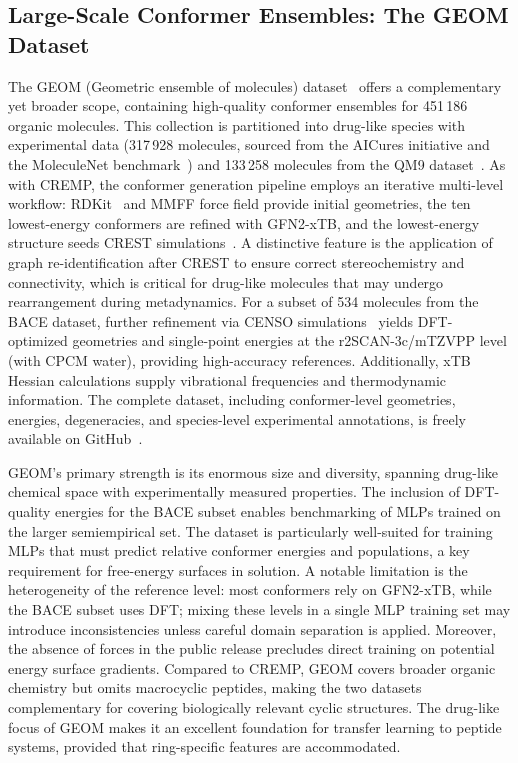 \documentclass[12pt]{article}
\begin{document}
\subsection{Large-Scale Conformer Ensembles: The GEOM Dataset}
\label{sec:geom}

The GEOM (Geometric ensemble of molecules) dataset~\cite{ds34-16} offers a complementary yet broader scope, containing high-quality conformer ensembles for 451\,186 organic molecules. This collection is partitioned into drug-like species with experimental data (317\,928 molecules, sourced from the AICures initiative and the MoleculeNet benchmark~\cite{ds34-166}) and 133\,258 molecules from the QM9 dataset~\cite{ds34-1}. As with CREMP, the conformer generation pipeline employs an iterative multi-level workflow: RDKit~\cite{ds33-97} and MMFF force field provide initial geometries, the ten lowest-energy conformers are refined with GFN2-xTB, and the lowest-energy structure seeds CREST simulations~\cite{ds34-164}. A distinctive feature is the application of graph re-identification after CREST to ensure correct stereochemistry and connectivity, which is critical for drug-like molecules that may undergo rearrangement during metadynamics. For a subset of 534 molecules from the BACE dataset, further refinement via CENSO simulations~\cite{ds34-167} yields DFT-optimized geometries and single-point energies at the r2SCAN-3c/mTZVPP level (with CPCM water), providing high-accuracy references. Additionally, xTB Hessian calculations supply vibrational frequencies and thermodynamic information. The complete dataset, including conformer-level geometries, energies, degeneracies, and species-level experimental annotations, is freely available on GitHub~\cite{ds34-168}.

GEOM's primary strength is its enormous size and diversity, spanning drug-like chemical space with experimentally measured properties. The inclusion of DFT-quality energies for the BACE subset enables benchmarking of MLPs trained on the larger semiempirical set. The dataset is particularly well-suited for training MLPs that must predict relative conformer energies and populations, a key requirement for free-energy surfaces in solution. A notable limitation is the heterogeneity of the reference level: most conformers rely on GFN2-xTB, while the BACE subset uses DFT; mixing these levels in a single MLP training set may introduce inconsistencies unless careful domain separation is applied. Moreover, the absence of forces in the public release precludes direct training on potential energy surface gradients. Compared to CREMP, GEOM covers broader organic chemistry but omits macrocyclic peptides, making the two datasets complementary for covering biologically relevant cyclic structures. The drug-like focus of GEOM makes it an excellent foundation for transfer learning to peptide systems, provided that ring-specific features are accommodated.
\end{document}
